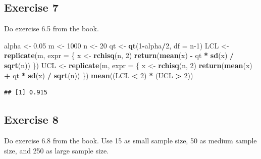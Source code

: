 \documentclass[
]{article}
\newenvironment{Shaded}{\begin{snugshade}}{\end{snugshade}}
\newcommand{\DataTypeTok}[1]{\textcolor[rgb]{0.13,0.29,0.53}{#1}}
\newcommand{\DecValTok}[1]{\textcolor[rgb]{0.00,0.00,0.81}{#1}}
\newcommand{\FloatTok}[1]{\textcolor[rgb]{0.00,0.00,0.81}{#1}}
\newcommand{\KeywordTok}[1]{\textcolor[rgb]{0.13,0.29,0.53}{\textbf{#1}}}
\newcommand{\NormalTok}[1]{#1}
\newcommand{\OperatorTok}[1]{\textcolor[rgb]{0.81,0.36,0.00}{\textbf{#1}}}
\newcommand{\StringTok}[1]{\textcolor[rgb]{0.31,0.60,0.02}{#1}}
\begin{document}
\hypertarget{exercise-7}{%
\subsection{Exercise 7}\label{exercise-7}}

Do exercise 6.5 from the book.

\begin{Shaded}
\begin{Highlighting}[]
\NormalTok{alpha <-}\StringTok{ }\FloatTok{0.05}
\NormalTok{m <-}\StringTok{ }\DecValTok{1000}
\NormalTok{n <-}\StringTok{ }\DecValTok{20}
\NormalTok{qt <-}\StringTok{ }\KeywordTok{qt}\NormalTok{(}\DecValTok{1}\OperatorTok{-}\NormalTok{alpha}\OperatorTok{/}\DecValTok{2}\NormalTok{, }\DataTypeTok{df =}\NormalTok{ n}\DecValTok{-1}\NormalTok{)}
\NormalTok{LCL <-}\StringTok{ }\KeywordTok{replicate}\NormalTok{(m, }\DataTypeTok{expr =}\NormalTok{ \{}
\NormalTok{  x <-}\StringTok{ }\KeywordTok{rchisq}\NormalTok{(n, }\DecValTok{2}\NormalTok{)}
  \KeywordTok{return}\NormalTok{(}\KeywordTok{mean}\NormalTok{(x) }\OperatorTok{-}\StringTok{ }\NormalTok{qt }\OperatorTok{*}\StringTok{ }\KeywordTok{sd}\NormalTok{(x) }\OperatorTok{/}\StringTok{ }\KeywordTok{sqrt}\NormalTok{(n))}
\NormalTok{\})}
\NormalTok{UCL <-}\StringTok{ }\KeywordTok{replicate}\NormalTok{(m, }\DataTypeTok{expr =}\NormalTok{ \{}
\NormalTok{  x <-}\StringTok{ }\KeywordTok{rchisq}\NormalTok{(n, }\DecValTok{2}\NormalTok{)}
  \KeywordTok{return}\NormalTok{(}\KeywordTok{mean}\NormalTok{(x) }\OperatorTok{+}\StringTok{ }\NormalTok{qt }\OperatorTok{*}\StringTok{ }\KeywordTok{sd}\NormalTok{(x) }\OperatorTok{/}\StringTok{ }\KeywordTok{sqrt}\NormalTok{(n))}
\NormalTok{\})}
\KeywordTok{mean}\NormalTok{((LCL }\OperatorTok{<}\StringTok{ }\DecValTok{2}\NormalTok{) }\OperatorTok{*}\StringTok{ }\NormalTok{(UCL }\OperatorTok{>}\StringTok{ }\DecValTok{2}\NormalTok{))}
\end{Highlighting}
\end{Shaded}

\begin{verbatim}
## [1] 0.915
\end{verbatim}

\hypertarget{exercise-8}{%
\subsection{Exercise 8}\label{exercise-8}}

Do exercise 6.8 from the book. Use 15 as small sample size, 50 as medium
sample size, and 250 as large sample size.
\end{document}
